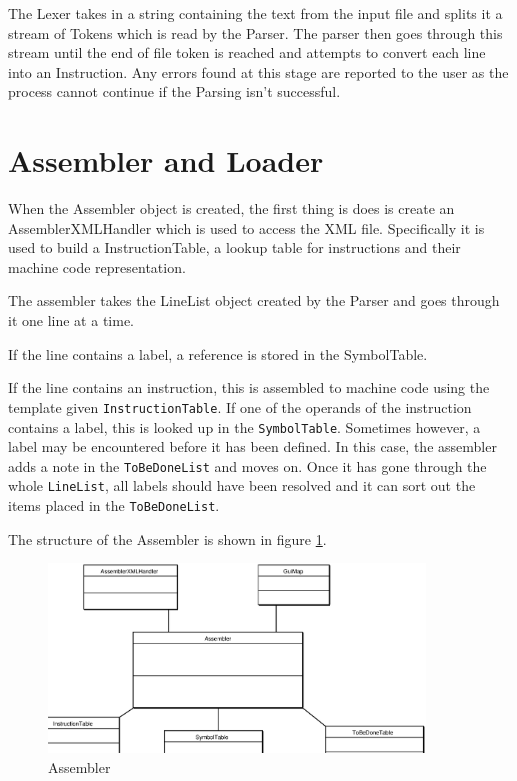 \documentclass[12pt]{report}
\begin{document}
The Lexer takes in a string containing the text from the input file and splits it a stream of Tokens which is read by the Parser.  The parser then goes through this stream until the end of file token is reached and attempts to convert each line into an Instruction.  Any errors found at this stage are reported to the user as the process cannot continue if the Parsing isn't successful.


\section{Assembler and Loader}

When the Assembler object is created, the first thing is does is create an AssemblerXMLHandler which is used to access the XML file.  Specifically it is used to build a InstructionTable, a lookup table for instructions and their machine code representation.

The assembler takes the LineList object created by the Parser and goes through it one line at a time.

If the line contains a label, a reference is stored in the SymbolTable.

If the line contains an instruction, this is assembled to machine code using the template given {\tt InstructionTable}.  If one of the operands of the instruction contains a label, this is looked up in the {\tt SymbolTable}.  Sometimes however, a label may be encountered before it has been defined. In this case, the assembler adds a note in the {\tt ToBeDoneList} and moves on. Once it has gone through the whole {\tt LineList}, all labels should have been resolved and it can sort out the items placed in the {\tt ToBeDoneList}.

The structure of the Assembler is shown in figure \ref{figAssembler}.

\begin{figure}[htbp]
\begin{center}
\includegraphics[width=10cm]{assembler.eps}
\end{center}
\caption{Assembler}
\label{figAssembler}
\end{figure}
\end{document}
